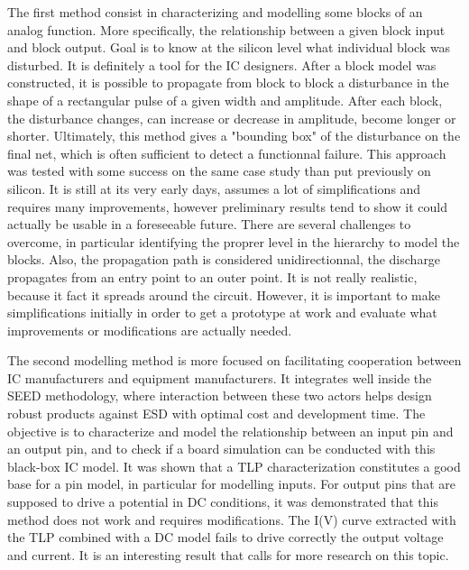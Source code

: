 The first method consist in characterizing and modelling some blocks of an analog function.
More specifically, the relationship between a given block input and block output.
Goal is to know at the silicon level what individual block was disturbed.
It is definitely a tool for the IC designers.
After a block model was constructed, it is possible to propagate from block to block a disturbance in the shape of a rectangular pulse of a given width and amplitude.
After each block, the disturbance changes, can increase or decrease in amplitude, become longer or shorter.
Ultimately, this method gives a "bounding box" of the disturbance on the final net, which is often sufficient to detect a functionnal failure.
This approach was tested with some success on the same case study than put previously on silicon.
It is still at its very early days, assumes a lot of simplifications and requires many improvements, however preliminary results tend to show it could actually be usable in a foreseeable future.
There are several challenges to overcome, in particular identifying the proprer level in the hierarchy to model the blocks.
Also, the propagation path is considered unidirectionnal, the discharge propagates from an entry point to an outer point.
It is not really realistic, because it fact it spreads around the circuit.
However, it is important to make simplifications initially in order to get a prototype at work and evaluate what improvements or modifications are actually needed.

The second modelling method is more focused on facilitating cooperation between IC manufacturers and equipment manufacturers.
It integrates well inside the SEED methodology, where interaction between these two actors helps design robust products against ESD with optimal cost and development time.
The objective is to characterize and model the relationship between an input pin and an output pin, and to check if a board simulation can be conducted with this black-box IC model.
It was shown that a TLP characterization constitutes a good base for a pin model, in particular for modelling inputs.
For output pins that are supposed to drive a potential in DC conditions, it was demonstrated that this method does not work and requires modifications.
The I(V) curve extracted with the TLP combined with a DC model fails to drive correctly the output voltage and current.
It is an interesting result that calls for more research on this topic.

